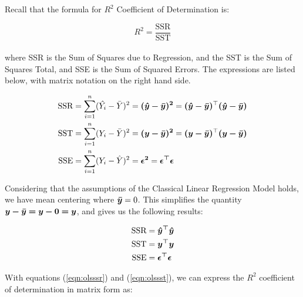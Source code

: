 \documentclass{article}
\begin{document}

\noindent Recall that the formula for $R^2$ Coefficient of Determination is: 

\begin{equation}
    R^2 = \frac{\text{SSR}}{\text{SST}}
\end{equation} \\

\noindent where SSR is the Sum of Squares due to Regression, and the SST is the Sum of Squares Total, and SSE is the Sum of Squared Errors. The expressions are listed below, with matrix notation on the right hand side. 

\begin{align}
    \text{SSR} &= \sum_{i=1}^n (\hat{Y_i}-\Bar{Y})^2 = \bm{(\Hat{y} - \Bar{y})^2} = \bm{(\Hat{y} - \Bar{y})}^\top \bm{(\Hat{y} - \Bar{y})} \\
    \text{SST} &= \sum_{i=1}^n (Y_i-\Bar{Y})^2 = \bm{({y} - \Bar{y})^2} = \bm{(y - \Bar{y})}^\top \bm{(y - \Bar{y})} \\
    \text{SSE} &= \sum_{i=1}^n (Y_i-\Hat{Y})^2 = \bm{\epsilon^2} = \bm{\epsilon^\top \epsilon}
\end{align}

\noindent Considering that the assumptions of the Classical Linear Regression Model holds, we have mean centering where $\bm{\Bar{y}} = 0$. This simplifies the quantity $\bm{y - \Bar{y} = y - 0 = y}$, and gives us the following results:

\begin{align}
    \label{eqn:olsssr} \text{SSR} &= \bm{\Hat{y}^\top}\bm{\Hat{y}} \\
    \label{eqn:olssst} \text{SST} &= \bm{\bm{y^\top y}} \\
    \label{eqn:olssse} \text{SSE} &= \bm{\epsilon^\top \epsilon}
\end{align}


\noindent With equations (\ref{eqn:olsssr}) and (\ref{eqn:olssst}), we can express the $R^2$ coefficient of determination in matrix form as:
\end{document}

